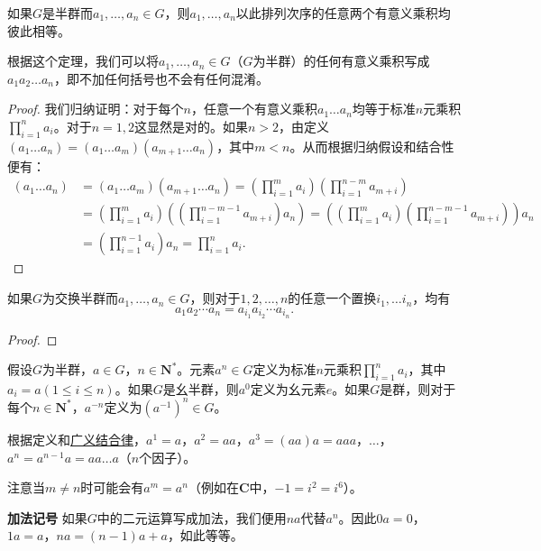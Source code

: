 \documentclass[../../main.tex]{subfiles}
\begin{document}
\begin{theorem}[广义结合律]\label{theorem:广义结合律}
如果$G$是半群而$a_1, \dots, a_n \in G$，则$a_1, \dots, a_n$以此排列次序的任意两个有意义乘积均彼此相等。
\end{theorem}
\begin{remark}
根据这个定理，我们可以将$a_1, \dots, a_n \in G$（$G$为半群）的任何有意义乘积写成$a_1 a_2 \dots a_n$，即不加任何括号也不会有任何混淆。
\end{remark}
\begin{proof}
我们归纳证明：对于每个$n$，任意一个有意义乘积$a_1 \dots a_n$均等于标准$n$元乘积$\prod_{i = 1}^n a_i$。对于$n = 1, 2$这显然是对的。如果$n > 2$，由定义$(a_1 \dots a_n) = (a_1 \dots a_m)(a_{m + 1} \dots a_n)$，其中$m < n$。从而根据归纳假设和结合性便有：
\begin{align*}
(a_1 \dots a_n) &= (a_1 \dots a_m)(a_{m + 1} \dots a_n) = \left( \prod_{i = 1}^m a_i \right) \left( \prod_{i = 1}^{n - m} a_{m + i} \right) \\
&= \left( \prod_{i = 1}^m a_i \right) \left( \left( \prod_{i = 1}^{n - m - 1} a_{m + i} \right) a_n \right) = \left( \left( \prod_{i = 1}^m a_i \right) \left( \prod_{i = 1}^{n - m - 1} a_{m + i} \right) \right) a_n \\
&= \left( \prod_{i = 1}^{n - 1} a_i \right) a_n = \prod_{i = 1}^n a_i.
\end{align*}

\end{proof}

\begin{theorem}[广义交换律]\label{theorem:广义交换律}
如果$G$为交换半群而$a_1, \dots, a_n \in G$，则对于$1, 2, \dots, n$的任意一个置换$i_1, \dots i_n$，均有
\[a_{1}a_{2}\cdots a_{n} = a_{i_1}a_{i_2}\cdots a_{i_n}.\]
\end{theorem}
\begin{proof}


\end{proof}

\begin{definition}[方幂]
假设$G$为半群，$a \in G$，$n \in \boldsymbol{N}^*$。元素$a^n \in G$定义为标准$n$元乘积$\prod_{i = 1}^n a_i$，其中$a_i = a(1 \leqslant i \leqslant n)$。如果$G$是幺半群，则$a^0$定义为幺元素$e$。如果$G$是群，则对于每个$n \in \boldsymbol{N}^*$，$a^{-n}$定义为$(a^{-1})^n \in G$。
\end{definition}
\begin{remark}
根据定义和\hyperref[theorem:广义结合律]{广义结合律}，$a^1 = a$，$a^2 = aa$，$a^3 = (aa)a = aaa$，$\dots$，$a^n = a^{n - 1}a = aa \dots a$（$n$个因子）。

注意当$m \neq n$时可能会有$a^m = a^n$（例如在$\boldsymbol{C}$中，$-1 = i^2 = i^6$）。

\textbf{加法记号}$\,\,$如果$G$中的二元运算写成加法，我们便用$na$代替$a^n$。因此$0a = 0$，$1a = a$，$na = (n - 1)a + a$，如此等等。
\end{remark}
\end{document}
